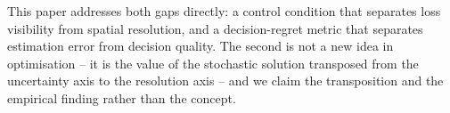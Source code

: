 This paper addresses both gaps directly: a control condition that separates loss
visibility from spatial resolution, and a decision-regret metric that separates
estimation error from decision quality. The second is not a new idea in optimisation --
it is the value of the stochastic solution transposed from the uncertainty axis to the
resolution axis %
-- and we claim the transposition and the empirical finding rather than the concept.

